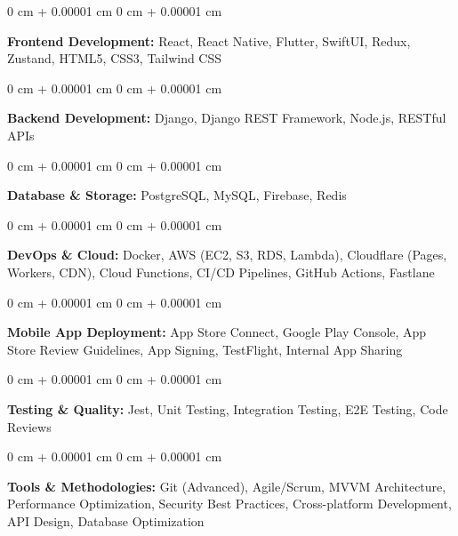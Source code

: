 \documentclass[10pt, letterpaper]{article}
\newenvironment{onecolentry}{
    \begin{adjustwidth}{
        0 cm + 0.00001 cm
    }{
        0 cm + 0.00001 cm
    }
}{
    \end{adjustwidth}
} %
\begin{document}
        \vspace{0.2 cm}

        \begin{onecolentry}
            \textbf{Frontend Development:} React, React Native, Flutter, SwiftUI, Redux, Zustand, HTML5, CSS3, Tailwind CSS
        \end{onecolentry}

        \vspace{0.2 cm}

        \begin{onecolentry}
            \textbf{Backend Development:} Django, Django REST Framework, Node.js, RESTful APIs
        \end{onecolentry}

        \vspace{0.2 cm}

        \begin{onecolentry}
            \textbf{Database \& Storage:} PostgreSQL, MySQL, Firebase, Redis
        \end{onecolentry}

        \vspace{0.2 cm}

        \begin{onecolentry}
            \textbf{DevOps \& Cloud:} Docker, AWS (EC2, S3, RDS, Lambda), Cloudflare (Pages, Workers, CDN), Cloud Functions, CI/CD Pipelines, GitHub Actions, Fastlane
        \end{onecolentry}

        \vspace{0.2 cm}

        \begin{onecolentry}
            \textbf{Mobile App Deployment:} App Store Connect, Google Play Console, App Store Review Guidelines, App Signing, TestFlight, Internal App Sharing
        \end{onecolentry}

        \vspace{0.2 cm}

        \begin{onecolentry}
            \textbf{Testing \& Quality:} Jest, Unit Testing, Integration Testing, E2E Testing, Code Reviews
        \end{onecolentry}

        \vspace{0.2 cm}

        \begin{onecolentry}
            \textbf{Tools \& Methodologies:} Git (Advanced), Agile/Scrum, MVVM Architecture, Performance Optimization, Security Best Practices, Cross-platform Development, API Design, Database Optimization
        \end{onecolentry}
\end{document}
